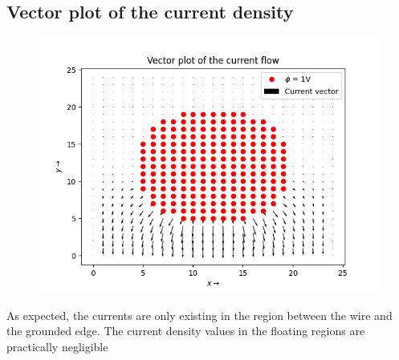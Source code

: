 \documentclass[12pt, a4paper]{article}
\begin{document}
\subsection{Vector plot of the current density}
\vspace*{-0.5cm}
\begin{figure}[H]
    \centering
    \includegraphics[scale = 0.75]{Figure_6.png}
    \label{fig:sample}
\end{figure}
\vspace*{-0.5cm}
\begin{center}
    As expected, the currents are only existing in the region between the wire and
the grounded edge. The current density values in the floating regions are
practically negligible
\end{center}
\end{document}
